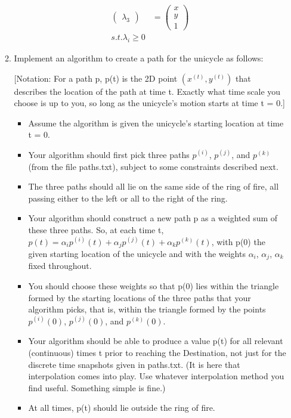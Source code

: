 \documentclass[conference,onecolumn]{IEEEtran}
\begin{document}
\begin{enumerate}[label=\arabic{enumi}.]
\begin{enumerate}
\begin{align*}
\begin{pmatrix}
                            \lambda_3
                        \end{pmatrix} & =
                        \begin{pmatrix}
                            x \\
                            y \\
                            1
                        \end{pmatrix}     \\
                        s.t. \lambda_i \geq 0
                    \end{align*}
              \item Implement an algorithm to create a path for the unicycle as follows:

                    [Notation: For a path p, p(t) is the 2D point $(x^{(t)}, y^{(t)})$ that describes the location of the path at time t.
                    Exactly what time scale you choose is up to you, so long as the unicycle's motion starts at time t = 0.]

                    \begin{itemize}
                        \item Assume the algorithm is given the unicycle's starting location at time t = 0.
                        \item Your algorithm should first pick three paths $p^{(i)}$, $p^{(j)}$, and $p^{(k)}$ (from the file paths.txt), subject to some constraints described next.
                        \item The three paths should all lie on the same side of the ring of fire, all passing either to the left or all to the right of the ring.
                        \item Your algorithm should construct a new path p as a weighted sum of these three paths.
                              So, at each time t, $p(t) = \alpha_i p^{(i)}(t) + \alpha_j p^{(j)}(t) + \alpha_k p^{(k)}(t)$, with p(0) the given starting location of the unicycle and with the weights $\alpha_i$, $\alpha_j$, $\alpha_k$ fixed throughout.
                        \item You should choose these weights so that p(0) lies within the triangle formed by the starting locations of the three paths that your algorithm picks, that is, within the triangle formed by the points $p^{(i)}(0)$, $p^{(j)}(0)$, and $p^{(k)}(0)$.
                        \item Your algorithm should be able to produce a value p(t) for all relevant (continuous) times t prior to reaching the Destination, not just for the discrete time snapshots given in paths.txt.
                              (It is here that interpolation comes into play.
                              Use whatever interpolation method you ﬁnd useful.
                              Something simple is fine.)
                        \item At all times, p(t) should lie outside the ring of fire.
                    \end{itemize}


\end{enumerate}
\end{enumerate}
\end{document}
